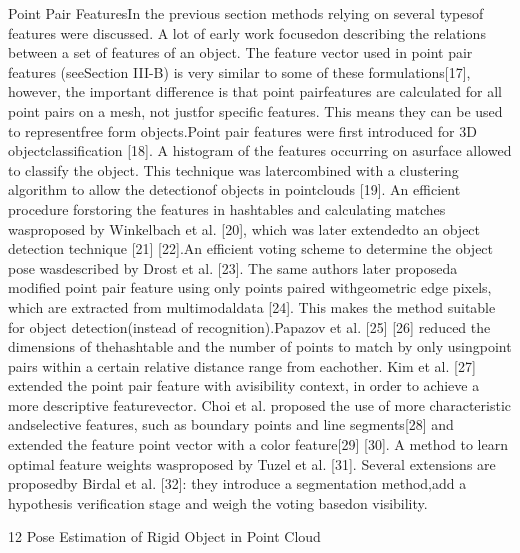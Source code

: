 \documentclass[10]{article}
\begin{document}
Point Pair FeaturesIn the previous section methods relying on several typesof features were discussed. A lot of early work focusedon describing the relations between a set of features of an object. The feature vector used in point pair features (seeSection III-B) is very similar to some of these formulations[17], however, the important difference is that point pairfeatures are calculated for all point pairs on a mesh, not justfor specific features. This means they can be used to representfree form objects.Point pair features were first introduced for 3D objectclassification [18]. A histogram of the features occurring on asurface allowed to classify the object. This technique was latercombined with a clustering algorithm to allow the detectionof objects in pointclouds [19]. An efficient procedure forstoring the features in hashtables and calculating matches wasproposed by Winkelbach et al. [20], which was later extendedto an object detection technique [21] [22].An efficient voting scheme to determine the object pose wasdescribed by Drost et al. [23]. The same authors later proposeda modified point pair feature using only points paired withgeometric edge pixels, which are extracted from multimodaldata [24]. This makes the method suitable for object detection(instead of recognition).Papazov et al. [25] [26] reduced the dimensions of thehashtable and the number of points to match by only usingpoint pairs within a certain relative distance range from eachother. Kim et al. [27] extended the point pair feature with avisibility context, in order to achieve a more descriptive featurevector. Choi et al. proposed the use of more characteristic andselective features, such as boundary points and line segments[28] and extended the feature point vector with a color feature[29] [30]. A method to learn optimal feature weights wasproposed by Tuzel et al. [31]. Several extensions are proposedby Birdal et al. [32]: they introduce a segmentation method,add a hypothesis verification stage and weigh the voting basedon visibility.


12 Pose Estimation of Rigid Object in Point Cloud\\
\end{document}
